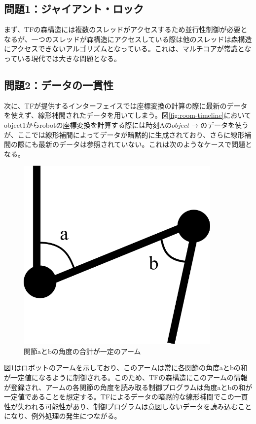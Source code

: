 \documentclass[a4paper]{jreport}	%
\begin{document}
\subsection*{問題1：ジャイアント・ロック}
まず、TFの森構造には複数のスレッドがアクセスするため並行性制御が必要となるが、一つのスレッドが森構造にアクセスしている際は他のスレッドは森構造にアクセスできないアルゴリズムとなっている。これは、マルチコアが常識となっている現代では大きな問題となる。

\subsection*{問題2：データの一貫性}
次に、TFが提供するインターフェイスでは座標変換の計算の際に最新のデータを使えず、線形補間されたデータを用いてしまう。図\ref{fig:room-timeline}においてobject1からrobotの座標変換を計算する際には時刻Aの$object \rightarrow$のデータを使うが、ここでは線形補間によってデータが暗黙的に生成されており、さらに線形補間の際にも最新のデータは参照されていない。これは次のようなケースで問題となる。

\begin{figure}[h] 
\centering
\includegraphics[width=10cm]{add-arm}	
\caption{関節aとbの角度の合計が一定のアーム}
\label{fig:add-arm}
\end{figure}

図\ref{fig:add-arm}はロボットのアームを示しており、このアームは常に各関節の角度aとbの和が一定値になるように制御される。このため、TFの森構造にこのアームの情報が登録され、アームの各関節の角度を読み取る制御プログラムは角度aとbの和が一定値であることを想定する。TFによるデータの暗黙的な線形補間でこの一貫性が失われる可能性があり、制御プログラムは意図しないデータを読み込むことになり、例外処理の発生につながる。
\end{document}
